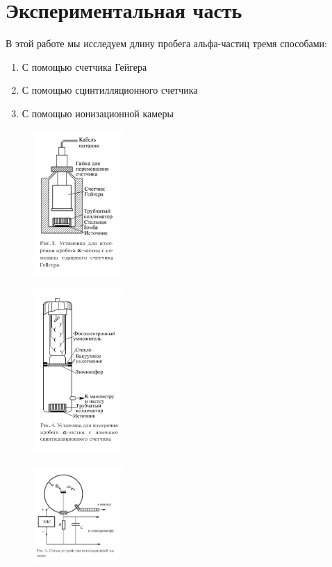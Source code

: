 \documentclass[a4paper,12pt]{article}
\begin{document}
	\section{Экспериментальная часть}
	    В этой работе мы исследуем длину пробега альфа-частиц тремя способами:
	    \begin{enumerate}
	        \item С помощью счетчика Гейгера
	        \item С помощью сцинтилляционного счетчика
	        \item С помощью ионизационной камеры
	    \end{enumerate}
	    
	            \begin{figure}[h!]
	            	\centering
	            	\includegraphics[width=0.3\textwidth]{1}
	            \end{figure}
	                    \begin{figure}[h!]
	                    	\centering
	                    	\includegraphics[width=0.3\textwidth]{2}
	                    \end{figure}
	                            \begin{figure}[h!]
	                            	\centering
	                            	\includegraphics[width=0.3\textwidth]{3}
	                            \end{figure}
	                            
\end{document}
